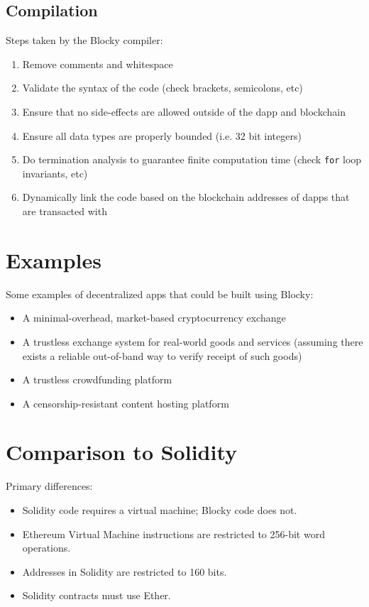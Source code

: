 \documentclass[letterpaper]{article}
\begin{document}
\subsection{Compilation}
Steps taken by the Blocky compiler:
\begin{enumerate}
  \item{Remove comments and whitespace}
  \item{Validate the syntax of the code (check brackets, semicolons, etc)}
  \item{Ensure that no side-effects are allowed outside of the dapp and blockchain}
  \item{Ensure all data types are properly bounded (i.e. 32 bit integers)}
  \item{Do termination analysis to guarantee finite computation time (check \texttt{for} loop invariants, etc)}
  \item{Dynamically link the code based on the blockchain addresses of dapps that are transacted with}
\end{enumerate}

\section{Examples}

Some examples of decentralized apps that could be built using Blocky:
\begin{itemize}
  \item{A minimal-overhead, market-based cryptocurrency exchange}
  \item{A trustless exchange system for real-world goods and services (assuming there exists a reliable out-of-band way to verify receipt of such goods)}
  \item{A trustless crowdfunding platform}
  \item{A censorship-resistant content hosting platform}
\end{itemize}

\section{Comparison to Solidity}

Primary differences:
\begin{itemize}
  \item{Solidity code requires a virtual machine\cite{ethereum15}; Blocky code does not.}
  \item{Ethereum Virtual Machine instructions are restricted to 256-bit word operations\cite{ethereum15}.}
  \item{Addresses in Solidity are restricted to 160 bits\cite{ethereum15}.}
  \item{Solidity contracts must use Ether\cite{ethereum15}.}
\end{itemize}
\end{document}
